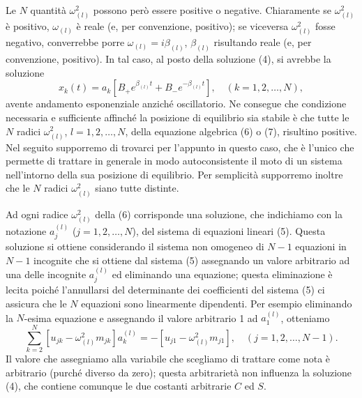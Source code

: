 \documentclass[11pt, a4paper]{book}
\numberwithin{equation}{section}
\begin{document}
Le $N$ quantità $\omega_{(l)}^2$ possono però essere positive o negative. Chiaramente se $\omega_{(l)}^2$ è positivo, $\omega_{(l)}$ è reale (e, per convenzione, positivo); se viceversa $\omega_{(l)}^2$ fosse negativo, converrebbe porre $\omega_{(l)} = i \beta_{(l)}$, $\beta_{(l)}$ risultando reale (e, per convenzione, positivo). In tal caso, al posto della soluzione (4), si avrebbe la soluzione
\begin{equation}
x_k(t) = a_k [B_+ e^{\beta_{(l)} t} + B_- e^{-\beta_{(l)} t}], \quad (k = 1, 2, \dots, N),
\end{equation}
avente andamento esponenziale anziché oscillatorio. Ne consegue che condizione necessaria e sufficiente affinché la posizione di equilibrio sia stabile è che tutte le $N$ radici $\omega_{(l)}^2$, $l = 1, 2, \dots, N$, della equazione algebrica (6) o (7), risultino positive. Nel seguito supporremo di trovarci per l'appunto in questo caso, che è l'unico che permette di trattare in generale in modo autoconsistente il moto di un sistema nell'intorno della sua posizione di equilibrio. Per semplicità supporremo inoltre che le $N$ radici $\omega_{(l)}^2$ siano tutte distinte.

Ad ogni radice $\omega_{(l)}^2$ della (6) corrisponde una soluzione, che indichiamo con la notazione $a_j^{(l)}$ ($j = 1, 2, \dots, N$), del sistema di equazioni lineari (5). Questa soluzione si ottiene considerando il sistema non omogeneo di $N-1$ equazioni in $N-1$ incognite che si ottiene dal sistema (5) assegnando un valore arbitrario ad una delle incognite $a_j^{(l)}$ ed eliminando una equazione; questa eliminazione è lecita poiché l'annullarsi del determinante dei coefficienti del sistema (5) ci assicura che le $N$ equazioni sono linearmente dipendenti. Per esempio eliminando la $N$-esima equazione e assegnando il valore arbitrario 1 ad $a_1^{(l)}$, otteniamo
\begin{equation}
\sum_{k=2}^{N} [u_{jk} - \omega_{(l)}^2 m_{jk}] a_k^{(l)} = -[u_{j1} - \omega_{(l)}^2 m_{j1}], \quad (j = 1, 2, \dots, N-1).
\end{equation}
Il valore che assegniamo alla variabile che scegliamo di trattare come nota è arbitrario (purché diverso da zero); questa arbitrarietà non influenza la soluzione (4), che contiene comunque le due costanti arbitrarie $C$ ed $S$.
\end{document}
